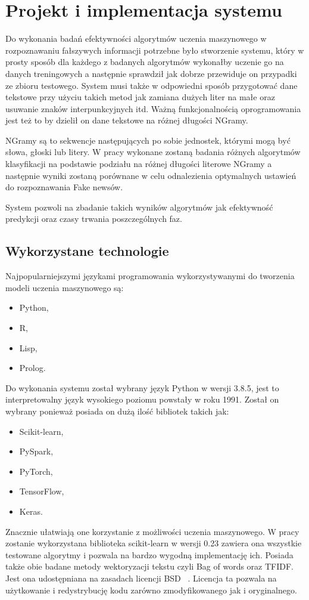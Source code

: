 \chapter{Projekt i implementacja systemu}
Do wykonania badań efektywności algorytmów uczenia maszynowego w rozpoznawaniu
fałszywych informacji potrzebne było stworzenie systemu, który w prosty sposób 
dla każdego z badanych algorytmów wykonałby uczenie go na danych treningowych 
a następnie sprawdził jak dobrze przewiduje on przypadki ze zbioru testowego.
System musi także w odpowiedni sposób przygotować dane tekstowe przy użyciu takich
metod jak zamiana dużych liter na małe oraz usuwanie znaków interpunkcyjnych itd.
Ważną funkcjonalnością oprogramowania jest też to by dzielił on dane tekstowe na 
różnej długości NGramy. 

NGramy są to sekwencje następujących po sobie jednostek, którymi mogą być słowa, 
głoski lub litery. W pracy wykonane zostaną badania różnych algorytmów klasyfikacji
na podstawie podziału na różnej długości literowe NGramy a następnie wyniki zostaną
porównane w celu odnalezienia optymalnych ustawień do rozpoznawania Fake newsów.

System pozwoli na zbadanie takich wyników algorytmów jak efektywność predykcji oraz 
czasy trwania poszczególnych faz.

\section{Wykorzystane technologie}
Najpopularniejszymi językami programowania wykorzystywanymi do tworzenia modeli uczenia
maszynowego są:
\begin{itemize}
    \item Python,
    \item R,
    \item Lisp,
    \item Prolog.
\end{itemize}
Do wykonania systemu został wybrany język Python w wersji 3.8.5, jest to interpretowalny
język wysokiego poziomu powstały w roku 1991. Został on wybrany 
ponieważ posiada on dużą ilość bibliotek takich jak: 
\begin{itemize}
    \item Scikit-learn,
    \item PySpark,
    \item PyTorch,
    \item TensorFlow,
    \item Keras.
\end{itemize}
Znacznie ułatwiają one korzystanie z możliwości uczenia maszynowego.
W pracy zostanie wykorzystana biblioteka scikit-learn w wersji 0.23 zawiera ona wszystkie 
testowane algorytmy i pozwala na bardzo wygodną implementację ich. Posiada także obie 
badane metody wektoryzacji tekstu czyli Bag of words oraz TFIDF. Jest ona udostępniana na zasadach licencji BSD ~\cite{scikitlearn}. 
Licencja ta pozwala na użytkowanie i redystrybucję kodu zarówno zmodyfikowanego jak i oryginalnego.

